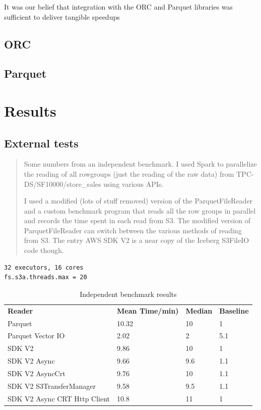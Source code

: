 \documentclass[manuscript]{acmart}
\begin{document}
It was our belief that integration with the ORC and Parquet libraries was
sufficient to deliver tangible speedups
\subsection{ORC}
\subsection{Parquet}



\section{Results}
\label{sec:results}

\subsection{External tests}

\begin{quotation}
 Some numbers from an independent benchmark.
 I used Spark to parallelize the reading of all rowgroups (just the reading of the raw data)
 from TPC-DS/SF10000/store_sales using various APIs.

I used a modified (lots of stuff removed) version of the ParquetFileReader and a custom
benchmark program that reads all the row groups in parallel and records the time spent in each read from S3.
The modified version of ParquetFileReader can switch between the various methods of reading from S3.
The entry AWS SDK V2 is a near copy of the Iceberg S3FileIO code though.

\end{quotation}

\begin{verbatim}
32 executors, 16 cores
fs.s3a.threads.max = 20
\end{verbatim}

\begin{table}
  \begin{tabular}{ l l l l }
    \hline
    \textbf{Reader} & \textbf{Mean Time/min)} & \textbf{Median} & \textbf{Baseline}\\
    Parquet	& 10.32	& 10 & 1 \\
    Parquet Vector IO	& 2.02 & 2	& 5.1 \\
    SDK V2 & 9.86 & 10 & 1 \\
    SDK V2 Async & 9.66	& 9.6 & 1.1 \\
    SDK V2 AsyncCrt	& 9.76 & 10 & 1.1 \\
    SDK V2 S3TransferManager & 9.58 & 9.5 & 1.1 \\
    SDK V2 Async CRT Http Client & 10.8 & 11 & 1 \\
    \hline
  \end{tabular}
\caption{Independent benchmark results}
\label{tab:independent-benchmark-results}
\end{table}
\end{document}
